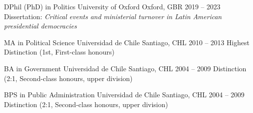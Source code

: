 





\begin{cventries}

\vspace{0.5mm}
\cventry
{DPhil (PhD) in Politics} 
{University of Oxford} 
{Oxford, GBR} 
{2019 -- 2023} 
{Dissertation: {\itshape Critical events and ministerial turnover in Latin American presidential democracies}} \vspace{1.5mm}

\cventry
{MA in Political Science} 
{Universidad de Chile} 
{Santiago, CHL} 
{2010 -- 2013} 
{Highest Distinction (1st, First-class honours)} \vspace{1.5mm}

\cventry
{BA in Government} 
{Universidad de Chile} 
{Santiago, CHL} 
{2004 -- 2009} 
{Distinction (2:1, Second-class honours, upper division)} \vspace{1.5mm}

\cventry
{BPS in Public Administration} 
{Universidad de Chile} 
{Santiago, CHL} 
{2004 -- 2009} 
{Distinction (2:1, Second-class honours, upper division)}\vspace{1.5mm}

\end{cventries}
